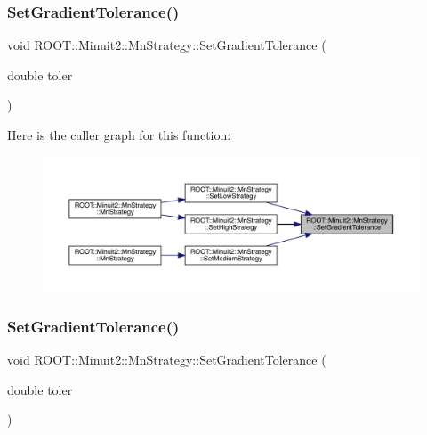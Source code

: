 \mbox{\label{classROOT_1_1Minuit2_1_1MnStrategy_aa7e6c4626962cd81e05821955ff562aa}} 
\subsubsection{\texorpdfstring{SetGradientTolerance()}{SetGradientTolerance()}\hspace{0.1cm}{\footnotesize\ttfamily [1/2]}}
{\footnotesize\ttfamily void R\+O\+O\+T\+::\+Minuit2\+::\+Mn\+Strategy\+::\+Set\+Gradient\+Tolerance (\begin{DoxyParamCaption}\item[{double}]{toler }\end{DoxyParamCaption})\hspace{0.3cm}{\ttfamily [inline]}}

Here is the caller graph for this function\+:\nopagebreak
\begin{figure}[H]
\begin{center}
\leavevmode
\includegraphics[width=350pt]{da/de4/classROOT_1_1Minuit2_1_1MnStrategy_aa7e6c4626962cd81e05821955ff562aa_icgraph}
\end{center}
\end{figure}
\mbox{\label{classROOT_1_1Minuit2_1_1MnStrategy_aa7e6c4626962cd81e05821955ff562aa}} 
\subsubsection{\texorpdfstring{SetGradientTolerance()}{SetGradientTolerance()}\hspace{0.1cm}{\footnotesize\ttfamily [2/2]}}
{\footnotesize\ttfamily void R\+O\+O\+T\+::\+Minuit2\+::\+Mn\+Strategy\+::\+Set\+Gradient\+Tolerance (\begin{DoxyParamCaption}\item[{double}]{toler }\end{DoxyParamCaption})\hspace{0.3cm}{\ttfamily [inline]}}


